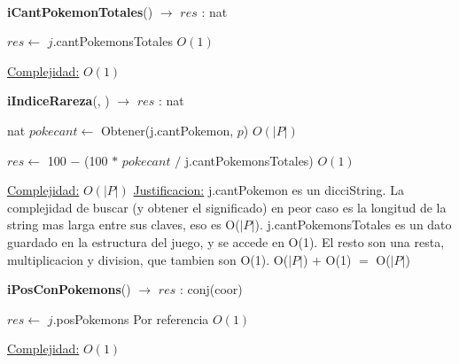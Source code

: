 \begin{Algoritmos}
$ $\newline
$ $\newline



\begin{algorithm}[H]
{\textbf{iCantPokemonTotales}() $\to$ $res$ : nat}
\begin{algorithmic}[1]

\State $res \gets$ $j$.cantPokemonsTotales \Comment $O(1)$

\medskip
\State \underline{Complejidad:} $O(1)$

\end{algorithmic}
\end{algorithm}


\begin{algorithm}[H]
{\textbf{iIndiceRareza}(, ) $\to$ $res$ : nat}
\begin{algorithmic}[1]

\State nat $pokecant \gets$ Obtener(j.cantPokemon, $p$) \Comment $O(|P|)$

\State $res \gets$ 100 $-$ (100 $*$ $pokecant$ $/$ j.cantPokemonsTotales) \Comment $O(1)$

\medskip
\State \underline{Complejidad:} $O(|P|)$
\State \underline{Justificacion:} j.cantPokemon es un dicciString. La complejidad de buscar (y obtener el significado) en peor caso es la longitud de la string mas larga entre sus claves, eso es O($|P|$). j.cantPokemonsTotales es un dato guardado en la estructura del juego, y se accede en O(1). El resto son una resta, multiplicacion y division, que tambien son O(1). O($|P|$) $+$ O(1) $=$ O($|P|$)

\end{algorithmic}
\end{algorithm}




\begin{algorithm}[H]
{\textbf{iPosConPokemons}() $\to$ $res$ : conj(coor)}
\begin{algorithmic}[1]

\State $res \gets$ $j$.posPokemons \Comment Por referencia $O(1)$
 
\medskip
\Statex \underline{Complejidad:} $O(1)$
\end{algorithmic}
\end{algorithm}



\end{Algoritmos}
